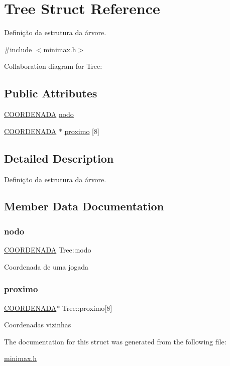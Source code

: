 \hypertarget{structTree}{}\section{Tree Struct Reference}
\label{structTree}


Definição da estrutura da árvore.  




{\ttfamily \#include $<$minimax.\+h$>$}



Collaboration diagram for Tree\+:
\subsection*{Public Attributes}
\begin{DoxyCompactItemize}
\item 
\hyperlink{structCOORDENADA}{C\+O\+O\+R\+D\+E\+N\+A\+DA} \hyperlink{structTree_abc891f05ffdda2289c85cf805b12ab64}{nodo}
\item 
\hyperlink{structCOORDENADA}{C\+O\+O\+R\+D\+E\+N\+A\+DA} $\ast$ \hyperlink{structTree_a16b9142f01bb4396e308d28475134f7c}{proximo} \mbox{[}8\mbox{]}
\end{DoxyCompactItemize}


\subsection{Detailed Description}
Definição da estrutura da árvore. 

\subsection{Member Data Documentation}
\mbox{\label{structTree_abc891f05ffdda2289c85cf805b12ab64}} 
\subsubsection{\texorpdfstring{nodo}{nodo}}
{\footnotesize\ttfamily \hyperlink{structCOORDENADA}{C\+O\+O\+R\+D\+E\+N\+A\+DA} Tree\+::nodo}

Coordenada de uma jogada \mbox{\label{structTree_a16b9142f01bb4396e308d28475134f7c}} 
\subsubsection{\texorpdfstring{proximo}{proximo}}
{\footnotesize\ttfamily \hyperlink{structCOORDENADA}{C\+O\+O\+R\+D\+E\+N\+A\+DA}$\ast$ Tree\+::proximo\mbox{[}8\mbox{]}}

Coordenadas vizinhas 

The documentation for this struct was generated from the following file\+:\begin{DoxyCompactItemize}
\item 
\hyperlink{minimax_8h}{minimax.\+h}\end{DoxyCompactItemize}
